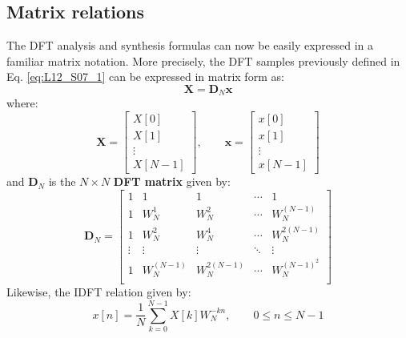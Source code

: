 \documentclass[../../main/main.tex]{subfiles}
\begin{document}
\subsection{Matrix relations}
The DFT analysis and synthesis formulas can now be easily expressed in a familiar matrix notation. More precisely, the DFT samples previously defined in Eq. \ref{eq:L12_S07_1} can be expressed in matrix form as:
\begin{equation}
    \mathbf{X}
    =
    \mathbf{D}_{N} \mathbf{x}
    \label{eq:L12_S16_2}
\end{equation}
where:
\begin{equation}
    \mathbf{X}
    =
        \begin{bmatrix}
            X[0]    \\
            X[1]    \\
            \vdots  \\
            X[N-1]
        \end{bmatrix},
    \qquad
    \mathbf{x}
    =
        \begin{bmatrix}
            x[0]    \\
            x[1]    \\
            \vdots  \\
            x[N-1]
        \end{bmatrix}
\end{equation}
and \( \mathbf{D}_{N} \) is the \( N \times N \) \textbf{DFT matrix} given by:
\begin{equation}
    \mathbf{D}_{N}
    =
    \begin{bmatrix}
        1   &   1   &   1   &   \cdots & 1   \\
        1   &   W_{N}^{1}   &   W_{N}^{2}   &   \cdots & W_{N}^{(N-1)}   \\
        1   &   W_{N}^{2}   &   W_{N}^{4}   &   \cdots & W_{N}^{2(N-1)}   \\
        \vdots  &   \vdots  &   \vdots  &   \ddots  &   \vdots  \\
        1   &   W_{N}^{(N-1)}   &   W_{N}^{2(N-1)}   &   \cdots & W_{N}^{(N-1)^2}   \\
    \end{bmatrix}
    \label{eq:L12_S17_1}
\end{equation}
Likewise, the IDFT relation given by:
\begin{equation}
    x[n]
    =
    \frac{1}{N} \sum_{k=0}^{N-1} X[k] W_{N}^{-kn},
    \qquad
    0 \le n \le N-1
    \label{eq:L12_S18_1}
\end{equation}
\end{document}
